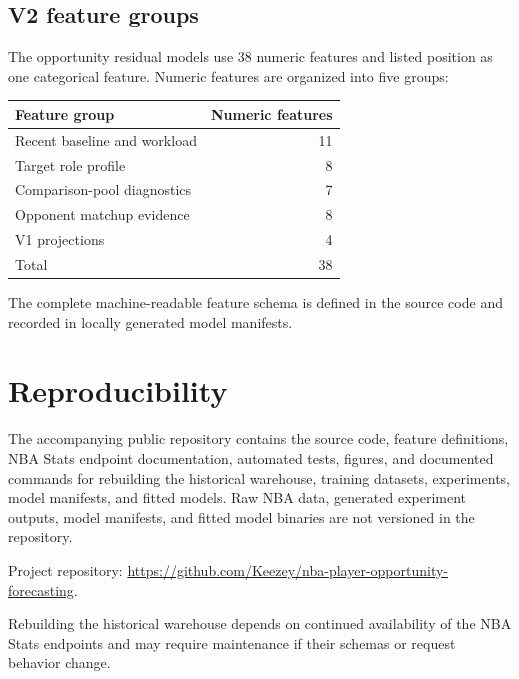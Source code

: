 \documentclass[11pt]{article}
\begin{document}
\subsection{V2 feature groups}

The opportunity residual models use 38 numeric features and listed position as
one categorical feature. Numeric features are organized into five groups:

\begin{table}[H]
\centering
\begin{tabular}{lr}
\toprule
Feature group & Numeric features \\
\midrule
Recent baseline and workload & 11 \\
Target role profile & 8 \\
Comparison-pool diagnostics & 7 \\
Opponent matchup evidence & 8 \\
V1 projections & 4 \\
\midrule
Total & 38 \\
\bottomrule
\end{tabular}
\end{table}

The complete machine-readable feature schema is defined in the source code and
recorded in locally generated model manifests.

\section{Reproducibility}

The accompanying public repository contains the source code, feature
definitions, NBA Stats endpoint documentation, automated tests, figures, and
documented commands for rebuilding the historical warehouse, training
datasets, experiments, model manifests, and fitted models. Raw NBA data,
generated experiment outputs, model manifests, and fitted model binaries are
not versioned in the repository.

Project repository:
\url{https://github.com/Keezey/nba-player-opportunity-forecasting}.

Rebuilding the historical warehouse depends on continued availability of the
NBA Stats endpoints and may require maintenance if their schemas or request
behavior change.
\end{document}
